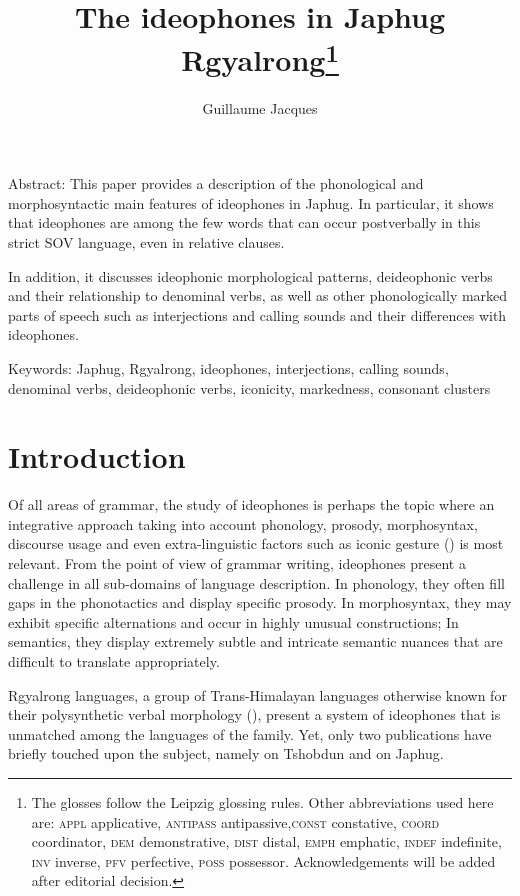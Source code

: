 \documentclass[oldfontcommands,oneside,a4paper,11pt]{article}
\begin{document}
 
 \title{The ideophones in Japhug Rgyalrong\footnote{
The glosses follow the Leipzig glossing rules. Other abbreviations used here are: \textsc{appl} applicative, \textsc{antipass} antipassive,\textsc{const} constative, \textsc{coord} coordinator, \textsc{dem} demonstrative, \textsc{dist} distal, \textsc{emph} emphatic, \textsc{indef} indefinite, \textsc{inv} inverse,  \textsc{pfv} perfective, \textsc{poss} possessor. %
Acknowledgements will be added after editorial decision.  %
} }
\author{Guillaume Jacques}
\maketitle
\linenumbers
 
Abstract: This paper provides a   description of the phonological and morphosyntactic main features of ideophones in Japhug. In particular, it shows that ideophones are among the few words that can occur postverbally in this strict SOV language, even in relative clauses.

In addition, it discusses  ideophonic morphological patterns, deideophonic verbs and their relationship to   denominal verbs, as well as other phonologically marked parts of speech such as interjections and calling sounds and their differences with ideophones.

Keywords: Japhug, Rgyalrong, ideophones, interjections, calling sounds, denominal verbs, deideophonic verbs, iconicity, markedness, consonant clusters


 \section{Introduction}
Of all areas of grammar, the study of ideophones is perhaps the   topic where an integrative approach taking into account phonology, prosody, morphosyntax, discourse usage and even extra-linguistic factors such as iconic gesture (\citealt{dingemanse11phd}) is most relevant. From the point of view of grammar writing, ideophones present a challenge in all sub-domains of language description. In phonology, they often fill gaps in the phonotactics and display specific prosody. In morphosyntax, they may exhibit specific alternations and occur in highly unusual constructions; In semantics, they display extremely subtle and intricate semantic nuances that are   difficult to translate appropriately.


 Rgyalrong languages, a group of Trans-Himalayan languages otherwise known for their polysynthetic verbal morphology (\citealt{jacques12incorp}), present a system of ideophones that is   unmatched   among the languages of the family. Yet, only two publications have briefly touched upon the subject, namely \citet{jackson04zhuangmaoci} on Tshobdun and \citet[305-17]{jacques08zh} on Japhug. 
 
\end{document}
